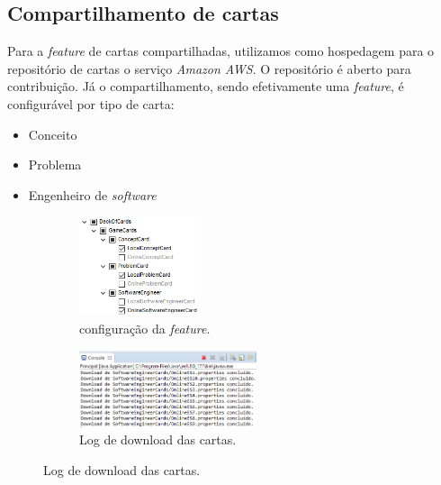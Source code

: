 \documentclass[11pt]{article}
\begin{document}
\subsection{Compartilhamento de cartas}
\label{sec:orgac9cd0a}
Para a \emph{feature} de cartas compartilhadas, utilizamos como hospedagem para o
repositório de cartas o serviço \emph{Amazon AWS}. O repositório é aberto para
contribuição. Já o compartilhamento, sendo efetivamente uma \emph{feature}, é configurável
por tipo de carta:
\begin{itemize}
\item Conceito
\item Problema
\item Engenheiro de \emph{software}
\end{itemize}
\begin{figure}[h] \centering
\begin{subfigure}[t]{0.45\textwidth} \centering
\begin{center}
\includegraphics[height=110px]{./img/config.png}
\end{center} 
\captionsetup{labelformat=empty} \caption{configuração da \textit{feature}.}
\end{subfigure}
\begin{subfigure}[t]{0.45\textwidth} \centering
\begin{center}
\includegraphics[height=85px]{./img/download.png}
\end{center} 
\captionsetup{labelformat=empty} \caption{Log de download das cartas.}
\end{subfigure}
\end{figure}
\end{document}
